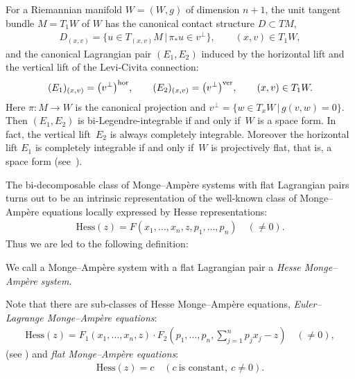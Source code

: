 \documentclass[pdftex]{sigma}
\begin{document}
\begin{Ex}
\label{hor+ver}
For a Riemannian manifold $W=(W,g)$ of dimension $n+1$,
the unit tangent bundle $M=T_1W$ of $W$ has
the canonical contact structure $D\subset TM$,
\begin{gather*}
D_{(x, v)} = \big\{ u \in T_{(x, v)}M \,|\, \pi_*u \in v^{\perp}\big\}, \qquad (x, v) \in T_1W,
\end{gather*}
and
the canonical Lagrangian pair $(E_1,E_2)$ induced by
the horizontal lift and the vertical lift of the
Levi-Civita connection:
\begin{gather*}
(E_1)_{(x, v)} = \big(v^\perp\big)^{\rm{hor}}, \qquad (E_2)_{(x, v)} =
\big(v^\perp\big)^{\rm{ver}}, \qquad (x, v) \in T_1W.
\end{gather*}
Here $\pi\colon M \longrightarrow W$ is the canonical projection
and $v^{\perp} = \{ w\in T_{x}W \,|\, g(v,w)=0 \}$.
Then $(E_1,E_2)$ is bi-Legendre-integrable if and only if~$W$ is a space form.
In fact, the vertical lift~$E_2$ is always completely integrable.
Moreover the horizontal lift $E_1$ is completely integrable
if and only if~$W$ is projectively f\/lat, that is, a space form (see~\cite[Corollaries~3.5 and~6.5]{Tak}).
\end{Ex}

The bi-decomposable class of Monge--Amp{\`e}re systems with f\/lat Lagrangian pairs
turns out to be an intrinsic representation of
the well-known class of Monge--Amp{\`e}re equations
locally expressed by Hesse representations:
\begin{gather*}
\mathrm{Hess}(z) = F(x_1, \dots, x_n, z, p_1, \dots, p_n)\quad (\not=0).
\end{gather*}
Thus we are led to the following def\/inition:

\begin{Def}
\label{Hesse-M-A-def}
We call a Monge--Amp{\`e}re system with a f\/lat Lagrangian pair
a {\it Hesse Monge--Amp{\`e}re system}.
\end{Def}

Note that there are sub-classes of Hesse Monge--Amp{\`e}re equations,
{\it Euler--Lagrange Monge--Amp{\`e}re equations}:
\begin{gather*}
\mathrm{Hess}(z) = F_1(x_1, \dots, x_n, z)\cdot
F_2\left(p_1,\dots, p_n, \sum_{j=1}^n p_jx_j-z\right)\quad (\not=0),
\end{gather*}
(see \cite[p.~21, Example~2]{B-G-G}) and {\it flat Monge--Amp{\`e}re equations}:
\begin{gather*}
\mathrm{Hess}(z) = c\quad (c \ \text{is constant}, \ c\not=0).
\end{gather*}
\end{document}
